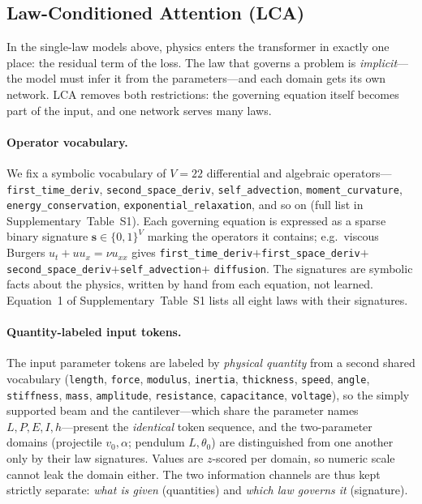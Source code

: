 \documentclass[11pt,a4paper]{article}
\begin{document}
\subsection*{Law-Conditioned Attention (LCA)}

In the single-law models above, physics enters the transformer in exactly one
place: the residual term of the loss. The law that governs a problem is
\emph{implicit}---the model must infer it from the parameters---and each
domain gets its own network. LCA removes both restrictions: the governing
equation itself becomes part of the input, and one network serves many laws.

\paragraph{Operator vocabulary.} We fix a symbolic vocabulary of
$V=22$ differential and algebraic operators---\texttt{first\_time\_deriv},
\texttt{second\_space\_deriv}, \texttt{self\_advection},
\texttt{moment\_curvature}, \texttt{energy\_conservation},
\texttt{exponential\_relaxation}, and so on (full list in
Supplementary~Table~S1). Each governing equation is expressed as a sparse
binary signature $\mathbf{s}\in\{0,1\}^{V}$ marking the operators it
contains; e.g.\ viscous Burgers $u_t+uu_x=\nu u_{xx}$ gives
\texttt{first\_time\_deriv}$+$\texttt{first\_space\_deriv}$+$
\texttt{second\_space\_deriv}$+$\texttt{self\_advection}$+$
\texttt{diffusion}. The signatures are symbolic facts about the physics,
written by hand from each equation, not learned. Equation~1 of
Supplementary~Table~S1 lists all eight laws with their signatures.

\paragraph{Quantity-labeled input tokens.} The input parameter tokens are
labeled by \emph{physical quantity} from a second shared vocabulary
(\texttt{length}, \texttt{force}, \texttt{modulus}, \texttt{inertia},
\texttt{thickness}, \texttt{speed}, \texttt{angle}, \texttt{stiffness},
\texttt{mass}, \texttt{amplitude}, \texttt{resistance},
\texttt{capacitance}, \texttt{voltage}), so the simply supported beam and
the cantilever---which share the parameter names $L,P,E,I,h$---present the
\emph{identical} token sequence, and the two-parameter domains
(projectile $v_0,\alpha$; pendulum $L,\theta_0$) are distinguished from one
another only by their law signatures. Values are $z$-scored per domain, so
numeric scale cannot leak the domain either. The two information channels
are thus kept strictly separate: \emph{what is given} (quantities) and
\emph{which law governs it} (signature).
\end{document}
